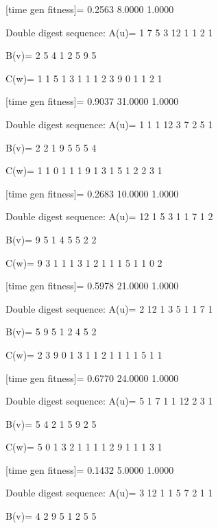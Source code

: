 [time gen fitness]=
    0.2563    8.0000    1.0000

Double digest sequence:
A(u)=
     1     7     5     3    12     1     1     2     1

B(v)=
     2     5     4     1     2     5     9     5

C(w)=
     1     1     5     1     3     1     1     1     2     3     9     0     1     1     2     1

[time gen fitness]=
    0.9037   31.0000    1.0000

Double digest sequence:
A(u)=
     1     1     1    12     3     7     2     5     1

B(v)=
     2     2     1     9     5     5     5     4

C(w)=
     1     1     0     1     1     1     9     1     3     1     5     1     2     2     3     1

[time gen fitness]=
    0.2683   10.0000    1.0000

Double digest sequence:
A(u)=
    12     1     5     3     1     1     7     1     2

B(v)=
     9     5     1     4     5     5     2     2

C(w)=
     9     3     1     1     1     3     1     2     1     1     1     5     1     1     0     2

[time gen fitness]=
    0.5978   21.0000    1.0000

Double digest sequence:
A(u)=
     2    12     1     3     5     1     1     7     1

B(v)=
     5     9     5     1     2     4     5     2

C(w)=
     2     3     9     0     1     3     1     1     2     1     1     1     1     5     1     1

[time gen fitness]=
    0.6770   24.0000    1.0000

Double digest sequence:
A(u)=
     5     1     7     1     1    12     2     3     1

B(v)=
     5     4     2     1     5     9     2     5

C(w)=
     5     0     1     3     2     1     1     1     1     2     9     1     1     1     3     1

[time gen fitness]=
    0.1432    5.0000    1.0000

Double digest sequence:
A(u)=
     3    12     1     1     5     7     2     1     1

B(v)=
     4     2     9     5     1     2     5     5


